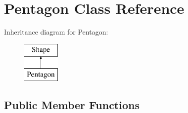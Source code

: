 \hypertarget{class_pentagon}{}\section{Pentagon Class Reference}
\label{class_pentagon}
Inheritance diagram for Pentagon\+:\begin{figure}[H]
\begin{center}
\leavevmode
\includegraphics[height=2.000000cm]{class_pentagon}
\end{center}
\end{figure}
\subsection*{Public Member Functions}

